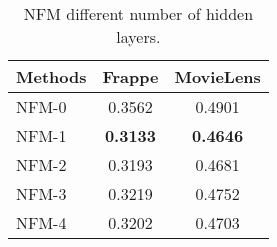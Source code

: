 \begin{table}[h]
	\vspace{-10pt}
	\begin{center}
		\caption{NFM \wrt different number of hidden layers.}
		\vspace{-10pt}
		\label{tab:layers}
		\begin{tabular}{| l | c | c |} \hline
			\textbf{Methods} & \textbf{Frappe} & \textbf{MovieLens} \\ \hline\hline
			NFM-0 	& 0.3562  & 0.4901 \\ \hline
			NFM-1 	& \textbf{0.3133}  & \textbf{0.4646} \\ \hline
			NFM-2 	& 0.3193  & 0.4681 \\ \hline
			NFM-3 	& 0.3219 & 0.4752 \\ \hline
			NFM-4 	& 0.3202  & 0.4703 \\ \hline
		\end{tabular}
	\end{center}
	\vspace{-10pt}
\end{table}



